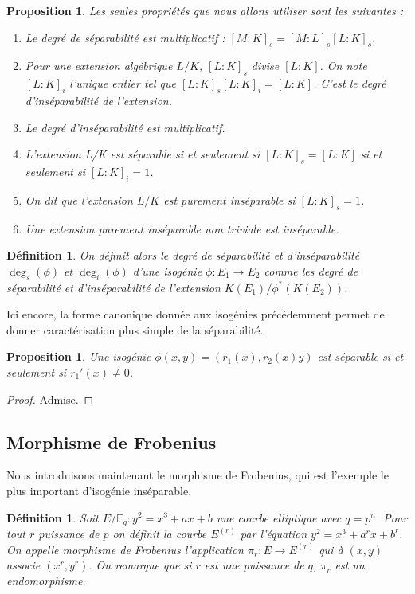 \documentclass{article}
\theoremstyle{plain}%
\newtheorem{prop}[thm]{Proposition}
\newtheorem{deff}[thm]{Définition}
\theoremstyle{definition}%
\newcommand{\F}{\mathbb{F}}
\begin{document}
\begin{prop}
Les seules
propriétés que nous allons utiliser sont les suivantes :
  \begin{enumerate}
    \item Le degré de séparabilité est multiplicatif : $[M : K]_s = [M : L]_s [L : K]_s$.
    \item Pour une extension algébrique $L/K$, $[L : K]_s$ divise $[L : K]$. On note $[L:K]_i$ l'unique entier tel que $[L:K]_s[L:K]_i=[L:K]$. C'est le degré d'inséparabilité de l'extension. 
    \item Le degré d'inséparabilité est multiplicatif.
    \item L’extension L/K est séparable si et seulement si $[L : K]_s = [L : K]$ si et seulement si $[L:K]_i = 1$.
    \item On dit que l'extension $L/K$ est purement inséparable si $[L:K]_s = 1$.
    \item Une extension purement inséparable non triviale est inséparable.
  \end{enumerate}
\end{prop}


\begin{deff}
On définit alors le degré de séparabilité et d'inséparabilité $\deg_s(\phi)$ et $\deg_i(\phi)$ d’une isogénie $\phi : E_1 \to E_2$ comme les degré de séparabilité et d'inséparabilité de l’extension $K(E_1)/\phi^*(K(E_2 ))$.
\end{deff}


Ici encore, la forme canonique donnée aux isogénies précédemment permet de donner caractérisation plus
simple de la séparabilité.

\begin{prop}
  \label{caracsep}
  Une isogénie $\phi(x, y) = (r_1(x), r_2(x)y)$ est séparable si et seulement si $r_1'(x) \neq 0$.
\end{prop}

\begin{proof}
  Admise.
\end{proof}

\subsection{Morphisme de Frobenius}

Nous introduisons maintenant le morphisme de Frobenius, qui est l'exemple le plus important d'isogénie inséparable.

\begin{deff}
  Soit $E/\F_q : y^2 = x^3 + ax + b$ une courbe elliptique avec $q = p^n$. Pour tout $r$ puissance de $p$ on définit la courbe $E^{(r)}$ par l'équation $y^2 = x^3 + a^r x + b^r$. On appelle morphisme de Frobenius l'application $\pi_r : E \to E^{(r)}$ qui à $(x, y)$ associe $(x^r, y^r)$. On remarque que si $r$ est une puissance de $q$, $\pi_r$ est un endomorphisme.
\end{deff}
\end{document}
